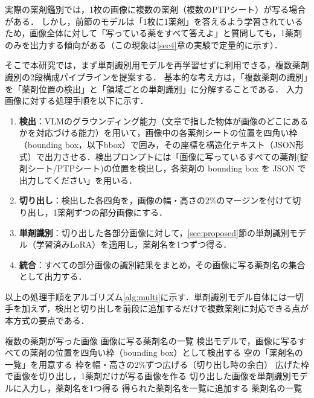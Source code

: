 \documentclass[dvipdfmx]{jsarticle}
\begin{document}
実際の薬剤鑑別では，1枚の画像に複数の薬剤（複数のPTPシート）が写る場合がある．
しかし，前節のモデルは「1枚に1薬剤」を答えるよう学習されているため，画像全体に対して「写っている薬をすべて答えよ」と質問しても，1薬剤のみを出力する傾向がある（この現象は\ref{sec4}章の実験で定量的に示す）．

そこで本研究では，まず単剤識別用モデルを再学習せずに利用できる，複数薬剤識別の2段構成パイプラインを提案する．
基本的な考え方は，「複数薬剤の識別」を「薬剤位置の検出」と「領域ごとの単剤識別」に分解することである．
入力画像に対する処理手順を以下に示す．

\begin{enumerate}
  \item \textbf{検出}：VLMのグラウンディング能力（文章で指した物体が画像のどこにあるかを対応づける能力）\cite{bai2023qwenvl}を用いて，画像中の各薬剤シートの位置を四角い枠（bounding box，以下bbox）で囲み，その座標を構造化テキスト（JSON形式）で出力させる．検出プロンプトには「画像に写っているすべての薬剤(錠剤シート/PTPシート)の位置を検出し，各薬剤の bounding box を JSON で出力してください」を用いる．
  \item \textbf{切り出し}：検出した各四角を，画像の幅・高さの2\%のマージンを付けて切り出し，1薬剤ずつの部分画像にする．
  \item \textbf{単剤識別}：切り出した各部分画像に対して，\ref{sec:proposed}節の単剤識別モデル（学習済みLoRA）を適用し，薬剤名を1つずつ得る．
  \item \textbf{統合}：すべての部分画像の識別結果をまとめ，その画像に写る薬剤名の集合として出力する．
\end{enumerate}

以上の処理手順をアルゴリズム\ref{alg:multi}に示す．単剤識別モデル自体には一切手を加えず，検出と切り出しを前段に追加するだけで複数薬剤に対応できる点が本方式の要点である．

\begin{algorithm}[htbp]
\caption{検出→単剤分類による複数薬剤同時識別}
\label{alg:multi}
\begin{algorithmic}[1]
\REQUIRE 複数の薬剤が写った画像
\ENSURE 画像に写る薬剤名の一覧
\STATE 検出モデルで，画像に写るすべての薬剤の位置を四角い枠（bounding box）として検出する
\STATE 空の「薬剤名の一覧」を用意する
  \STATE 枠を幅・高さの2\%ずつ広げる（切り出し時の余白）
  \STATE 広げた枠で画像を切り出し，1薬剤だけが写る画像を作る
  \STATE 切り出した画像を単剤識別モデルに入力し，薬剤名を1つ得る
  \STATE 得られた薬剤名を一覧に追加する
\ENDFOR
\RETURN 薬剤名の一覧
\end{algorithmic}
\end{algorithm}
\end{document}
